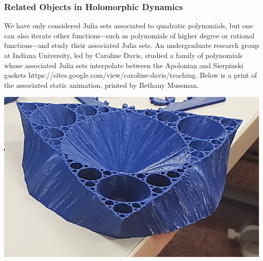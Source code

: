 \documentclass[12 pt]{article}
\begin{document}
\subsubsection{Related Objects in Holomorphic Dynamics}\label{CarolineUndergrad}
    We have only considered Julia sets associated to quadratic polynomials, but one can also iterate other functions$-$such as polynomials of higher degree or rational functions$-$and study their associated Julia sets.  An undergraduate research group at Indiana University, led by Caroline Davis, studied a family of polynomials whose associated Julia sets interpolate between the Apolonian and Sierpinski gaskets https://sites.google.com/view/caroline-davis/teaching.  Below is a print of the associated static animation, printed by Bethany Mussman.
    \begin{center}
    \includegraphics[width=.6\paperwidth]{images/caroline1.png}
    \end{center}
\end{document}
